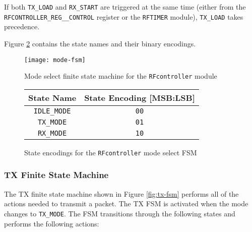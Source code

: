 If both \texttt{TX\_LOAD} and \texttt{RX\_START} are triggered at the same time (either from the \texttt{RFCONTROLLER\_REG\_\_CONTROL} register or the \texttt{RFTIMER} module), \texttt{TX\_LOAD} takes precedence.

Figure \ref{table:modes} contains the state names and their binary encodings.

\begin{figure}
	\centering
	\texttt{[image: mode-fsm]}
	\caption{Mode select finite state machine for the \texttt{RFcontroller} module}
	\label{fig:mode-fsm}
\end{figure}

\begin{figure}
	\centering
	\begin{tabular}{|c|c|}
		\hline
		State Name & State Encoding [MSB:LSB] \\
		\hline
		\texttt{IDLE\_MODE} & \texttt{00} \\
		\texttt{TX\_MODE} & \texttt{01} \\
		\texttt{RX\_MODE} & \texttt{10} \\
		\hline
	\end{tabular}
	\caption{State encodings for the \texttt{RFcontroller} mode select FSM}
	\label{table:modes}
\end{figure}

\subsubsection{TX Finite State Machine}
The TX finite state machine shown in Figure \ref{fig:tx-fsm} performs all of the actions needed to transmit a packet. The TX FSM is activated when the mode changes to \texttt{TX\_MODE}. The FSM transitions through the following states and performs the following actions:

